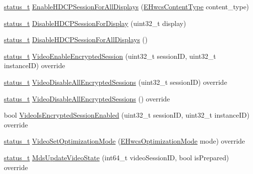 \begin{DoxyCompactItemize}
\item 
\mbox{\hyperlink{hwcserviceapi_8h_a3806fb2027d9a316d8ca8d9b8b8eb96f}{status\+\_\+t}} \mbox{\hyperlink{classhwcomposer_1_1BpControls_a2dd503c471873b1aae313a4d0b923ece}{Enable\+H\+D\+C\+P\+Session\+For\+All\+Displays}} (\mbox{\hyperlink{hwcserviceapi_8h_a69e9b3a54e4c8e504845398c66eab655}{E\+Hwcs\+Content\+Type}} content\+\_\+type)
\item 
\mbox{\hyperlink{hwcserviceapi_8h_a3806fb2027d9a316d8ca8d9b8b8eb96f}{status\+\_\+t}} \mbox{\hyperlink{classhwcomposer_1_1BpControls_a0a31e50e1213e86bb6737d929fe06170}{Disable\+H\+D\+C\+P\+Session\+For\+Display}} (uint32\+\_\+t display)
\item 
\mbox{\hyperlink{hwcserviceapi_8h_a3806fb2027d9a316d8ca8d9b8b8eb96f}{status\+\_\+t}} \mbox{\hyperlink{classhwcomposer_1_1BpControls_a7ab7f839df5c6e56bbe82a91c0b6e5c2}{Disable\+H\+D\+C\+P\+Session\+For\+All\+Displays}} ()
\item 
\mbox{\hyperlink{hwcserviceapi_8h_a3806fb2027d9a316d8ca8d9b8b8eb96f}{status\+\_\+t}} \mbox{\hyperlink{classhwcomposer_1_1BpControls_a108c7339e8405ba05e71dacbd09873ad}{Video\+Enable\+Encrypted\+Session}} (uint32\+\_\+t session\+ID, uint32\+\_\+t instance\+ID) override
\item 
\mbox{\hyperlink{hwcserviceapi_8h_a3806fb2027d9a316d8ca8d9b8b8eb96f}{status\+\_\+t}} \mbox{\hyperlink{classhwcomposer_1_1BpControls_a6de03491836ce5216983fbd2c68c10fc}{Video\+Disable\+All\+Encrypted\+Sessions}} (uint32\+\_\+t session\+ID) override
\item 
\mbox{\hyperlink{hwcserviceapi_8h_a3806fb2027d9a316d8ca8d9b8b8eb96f}{status\+\_\+t}} \mbox{\hyperlink{classhwcomposer_1_1BpControls_afece8428dda4cdcb2cde67652ee5913d}{Video\+Disable\+All\+Encrypted\+Sessions}} () override
\item 
bool \mbox{\hyperlink{classhwcomposer_1_1BpControls_a9dba61bf0300c425989f727792626c9a}{Video\+Is\+Encrypted\+Session\+Enabled}} (uint32\+\_\+t session\+ID, uint32\+\_\+t instance\+ID) override
\item 
\mbox{\hyperlink{hwcserviceapi_8h_a3806fb2027d9a316d8ca8d9b8b8eb96f}{status\+\_\+t}} \mbox{\hyperlink{classhwcomposer_1_1BpControls_a1bcd10d109be05687f174905140da789}{Video\+Set\+Optimization\+Mode}} (\mbox{\hyperlink{hwcserviceapi_8h_a73044de23b8f474352d6753e21fca06d}{E\+Hwcs\+Optimization\+Mode}} mode) override
\item 
\mbox{\hyperlink{hwcserviceapi_8h_a3806fb2027d9a316d8ca8d9b8b8eb96f}{status\+\_\+t}} \mbox{\hyperlink{classhwcomposer_1_1BpControls_a660d3860d1631b9243996cb53fbaca39}{Mds\+Update\+Video\+State}} (int64\+\_\+t video\+Session\+ID, bool is\+Prepared) override

\end{DoxyCompactItemize}
